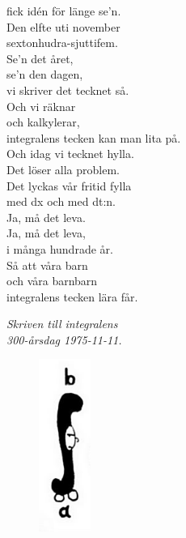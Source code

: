 \documentclass[a6paper,10pt]{article}
\begin{document}
fick idén för länge se'n. \\
Den elfte uti november \\
sextonhudra-sjuttifem. \\
Se'n det året, \\
se'n den dagen, \\
vi skriver det tecknet så. \\
Och vi räknar \\
och kalkylerar, \\
integralens tecken kan man lita på. 
\vspace{5pt} \\
Och idag vi tecknet hylla. \\
Det löser alla problem. \\
Det lyckas vår fritid fylla \\
med dx och med dt:n. \\
Ja, må det leva. \\
Ja, må det leva, \\
i många hundrade år. \\
Så att våra barn \\
och våra barnbarn \\
integralens tecken lära får. 
\begin{flushright}
\textit{Skriven till integralens\\ 300-årsdag 1975-11-11.}
\end{flushright}
\vspace{-10pt}
\begin{figure}[!h]
\hspace{30pt}\includegraphics[width=0.15\textwidth]{integral.jpg}
\end{figure}
\end{document}
